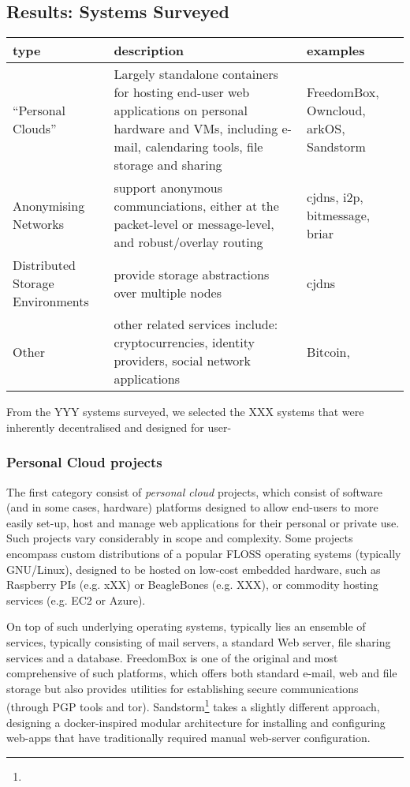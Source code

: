 \documentclass{amsart}
\begin{document}
\subsection{Results: Systems Surveyed}

\begin{figure*}[tb]
\begin{tabular}{ l p{2.8in} p{2.3in} }
type & description & examples \\ \hline
  ``Personal Clouds'' & Largely standalone containers for hosting end-user web applications on personal hardware and VMs, including e-mail, calendaring tools, file storage and sharing & FreedomBox, Owncloud, arkOS, Sandstorm \\
  Anonymising Networks & support anonymous communciations, either at the packet-level or message-level, and robust/overlay routing & cjdns, i2p, bitmessage, briar \\
  Distributed Storage Environments & provide storage abstractions over multiple nodes & cjdns \\
  Other & other related services include: cryptocurrencies, identity providers, social network applications & Bitcoin, \\
\end{tabular}
\end{figure*}

From the YYY systems surveyed, we selected the XXX systems that were inherently decentralised and designed for user-

\subsubsection{Personal Cloud projects}

The first category consist of \emph{personal cloud} projects, which consist of software (and in some cases, hardware) platforms designed to allow end-users to more easily set-up, host and manage web applications for their personal or private use.  Such projects vary considerably in scope and complexity. Some projects encompass custom distributions of a popular FLOSS operating systems (typically GNU/Linux), designed to be hosted on low-cost embedded hardware, such as Raspberry PIs (e.g. xXX) or BeagleBones (e.g. XXX), or commodity hosting services (e.g. EC2 or Azure). 

On top of such underlying operating systems, typically lies an ensemble of services, typically consisting of mail servers, a standard Web server, file sharing services and a database. FreedomBox is one of the original and most comprehensive of such platforms, which offers both standard e-mail, web and file storage but also provides utilities for establishing secure communications (through PGP tools and tor).  Sandstorm\footnote{} takes a slightly different approach, designing a docker-inspired modular architecture for installing and configuring web-apps that have traditionally required manual web-server configuration. 
\end{document}
